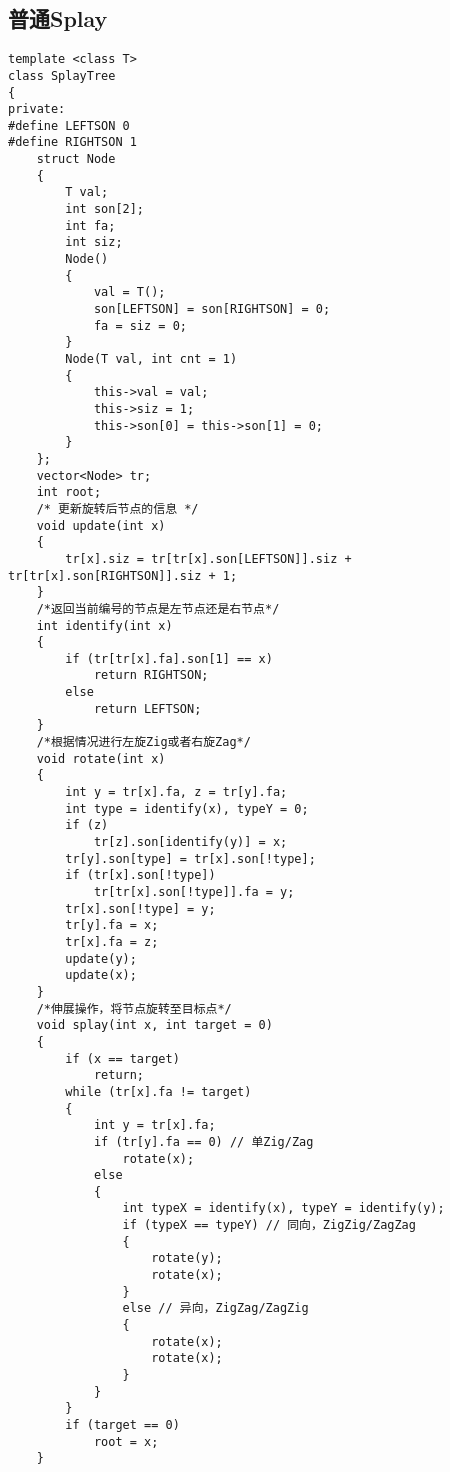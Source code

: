 \documentclass{ctexbook}  %
\begin{document}
\subsection{普通Splay}
\lstset{basicstyle=	tfamily}
\begin{Verbatim}[fontsize=\small]
template <class T>
class SplayTree
{
private:
#define LEFTSON 0
#define RIGHTSON 1
    struct Node
    {
        T val;
        int son[2];
        int fa;
        int siz;
        Node()
        {
            val = T();
            son[LEFTSON] = son[RIGHTSON] = 0;
            fa = siz = 0;
        }
        Node(T val, int cnt = 1)
        {
            this->val = val;
            this->siz = 1;
            this->son[0] = this->son[1] = 0;
        }
    };
    vector<Node> tr;
    int root;
    /* 更新旋转后节点的信息 */
    void update(int x)
    {
        tr[x].siz = tr[tr[x].son[LEFTSON]].siz + tr[tr[x].son[RIGHTSON]].siz + 1;
    }
    /*返回当前编号的节点是左节点还是右节点*/
    int identify(int x)
    {
        if (tr[tr[x].fa].son[1] == x)
            return RIGHTSON;
        else
            return LEFTSON;
    }
    /*根据情况进行左旋Zig或者右旋Zag*/
    void rotate(int x)
    {
        int y = tr[x].fa, z = tr[y].fa;
        int type = identify(x), typeY = 0;
        if (z)
            tr[z].son[identify(y)] = x;
        tr[y].son[type] = tr[x].son[!type];
        if (tr[x].son[!type])
            tr[tr[x].son[!type]].fa = y;
        tr[x].son[!type] = y;
        tr[y].fa = x;
        tr[x].fa = z;
        update(y);
        update(x);
    }
    /*伸展操作，将节点旋转至目标点*/
    void splay(int x, int target = 0)
    {
        if (x == target)
            return;
        while (tr[x].fa != target)
        {
            int y = tr[x].fa;
            if (tr[y].fa == 0) // 单Zig/Zag
                rotate(x);
            else
            {
                int typeX = identify(x), typeY = identify(y);
                if (typeX == typeY) // 同向，ZigZig/ZagZag
                {
                    rotate(y);
                    rotate(x);
                }
                else // 异向，ZigZag/ZagZig
                {
                    rotate(x);
                    rotate(x);
                }
            }
        }
        if (target == 0)
            root = x;
    }


\end{Verbatim}
\end{document}
